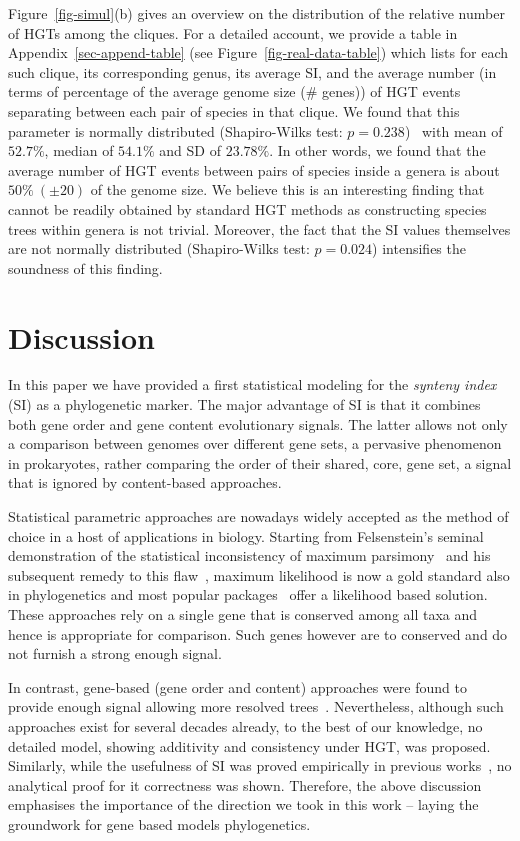 \documentclass[runningheads, 11pt]{llncs}
\begin{document}
Figure~\ref{fig-simul}(b) gives an overview on the distribution of the relative
number of HGTs among the cliques. For a detailed account, we provide a table in
Appendix~\ref{sec-append-table} (see Figure~\ref{fig-real-data-table}) which
lists for each such clique, its corresponding genus, its average SI, and the
average number (in terms of percentage of the average genome size (\# genes)) of
HGT events separating between each pair of	species in that clique.  We found
that this parameter is normally distributed (Shapiro-Wilks test:
$p=0.238$)~\cite{Shapiro-Wilks-book} with mean of $52.7\%$, median of $54.1\%$
and SD of $23.78\%$. In other words, we found that the average number of HGT
events between pairs of species inside a genera is about $50\%~(\pm 20)$ of the
genome size. We believe this is an interesting finding that cannot be readily
obtained by standard HGT methods as constructing species trees within genera is
not trivial. Moreover, the fact that the SI values themselves are not normally
distributed (Shapiro-Wilks test: $p=0.024$) intensifies the soundness of this
finding.

\section{Discussion}
In this paper we have provided a first statistical modeling for the {\em synteny
index} (SI) as a phylogenetic marker. The major advantage of SI is that it
combines both gene order and gene content evolutionary signals. The latter
allows not only a comparison between genomes over different gene sets, a
pervasive phenomenon in prokaryotes, rather comparing the order of their shared,
core, gene set, a signal that is ignored by content-based approaches.

Statistical parametric approaches are nowadays widely accepted as the method
of choice in a host of applications in biology. Starting from Felsenstein's
seminal demonstration of the statistical inconsistency of maximum
parsimony~\cite{FELSENSTEIN78} and his subsequent remedy to this
flaw~\cite{felsenstein1981evolutionary}, maximum likelihood is now a gold
standard also in phylogenetics and most popular
packages~\cite{Swofford81,PHYLIP,PhyML-systBiol-2010} offer a likelihood based
solution. These approaches rely on a single gene that is conserved among all
taxa and hence is appropriate for comparison. Such genes however are to
conserved and do not furnish a strong enough signal.

In contrast, gene-based (gene order and content) approaches were found to
provide enough signal allowing more resolved trees~\cite{Wolf-BMC-2001}.
Nevertheless, although such approaches exist for several decades already, to the
best of our knowledge, no detailed model, showing additivity and consistency
under HGT, was proposed. Similarly, while the usefulness of SI was proved
empirically in previous works~\cite{Shifman13,Adato-PLOSCB-2015}, no analytical
proof for it correctness was shown. Therefore, the above discussion emphasises
the importance of the direction we took in this work -- laying the groundwork for
gene based models phylogenetics.
\end{document}
